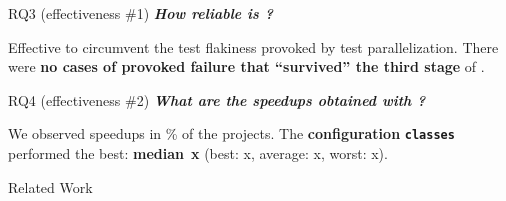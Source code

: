 \documentclass{beamer}
\begin{document}
\begin{frame}{RQ3 (effectiveness \#1)}
	\textbf{\textit{How {\rsm reliable} is \tname?}}
	\begin{center}\pause
		\begin{tcolorbox}
			Effective to circumvent the test flakiness provoked by test parallelization. There were \textbf{\color{red}no cases of provoked failure that ``survived'' the third stage} of \tname.
		\end{tcolorbox}
	\end{center}
\end{frame}

\begin{frame}{RQ4 (effectiveness \#2)}
	\textbf{\textit{What are the {\rsm speedups obtained} with \tname?}}
	\begin{center}\pause
		\begin{tcolorbox}
			We observed speedups in \FrequencySpeedups\% of the projects. The {\color{red}\textbf{configuration} \texttt{\textbf{classes}}} performed the best: {\color{red} \textbf{median}~\textbf{\SpeedupClassesMedian{}x}} (best: \SpeedupClassesMax{}x, average: \SpeedupClassesAvg{}x, worst: \SpeedupClassesMin{}x).
		\end{tcolorbox}
	\end{center}
\end{frame}

\begingroup
\renewcommand{\disp}{}
\begin{frame}
	\begin{center}
		Related Work
	\end{center}
\end{frame}
\endgroup
\addtocounter{framenumber}{-1}
\end{document}
